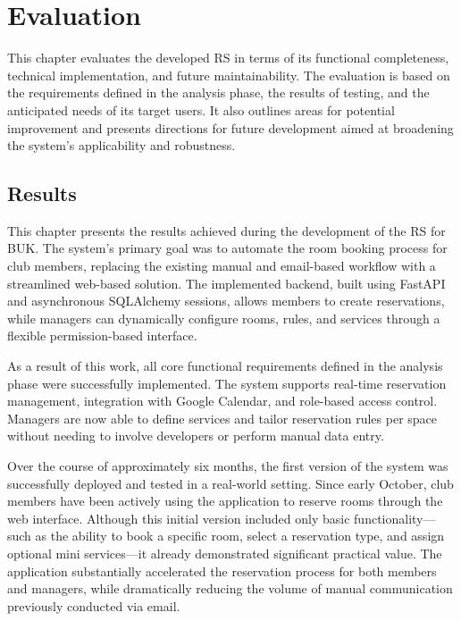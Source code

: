 \chapter{Evaluation}

This chapter evaluates the developed RS in terms of its functional completeness, technical implementation, and future maintainability. The evaluation is based on the requirements defined in the analysis phase, the results of testing, and the anticipated needs of its target users. It also outlines areas for potential improvement and presents directions for future development aimed at broadening the system’s applicability and robustness.

\section{Results}

This chapter presents the results achieved during the development of the RS for BUK. The system’s primary goal was to automate the room booking process for club members, replacing the existing manual and email-based workflow with a streamlined web-based solution. The implemented backend, built using FastAPI and asynchronous SQLAlchemy sessions, allows members to create reservations, while managers can dynamically configure rooms, rules, and services through a flexible permission-based interface.

As a result of this work, all core functional requirements defined in the analysis phase were successfully implemented. The system supports real-time reservation management, integration with Google Calendar, and role-based access control. Managers are now able to define services and tailor reservation rules per space without needing to involve developers or perform manual data entry.

Over the course of approximately six months, the first version of the system was successfully deployed and tested in a real-world setting. Since early October, club members have been actively using the application to reserve rooms through the web interface. Although this initial version included only basic functionality—such as the ability to book a specific room, select a reservation type, and assign optional mini services—it already demonstrated significant practical value. The application substantially accelerated the reservation process for both members and managers, while dramatically reducing the volume of manual communication previously conducted via email.

